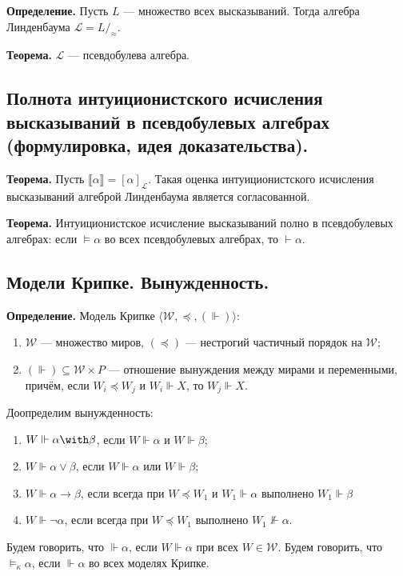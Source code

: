 \documentclass[10pt,a4paper,oneside]{article}
\begin{document}
\noindent \textbf{ Определение. }
Пусть $L$ --- множество всех высказываний. Тогда алгебра Линденбаума $\mathcal{L} = L/_\approx$.

\noindent \textbf{ Теорема. }
$\mathcal{L}$ --- псевдобулева алгебра.

\subsection{Полнота интуиционистского исчисления высказываний в псевдобулевых алгебрах (формулировка, идея доказательства).}
\noindent \textbf{ Теорема. }
Пусть $\llbracket\alpha\rrbracket = [\alpha]_\mathcal{L}$.
Такая оценка интуиционистского исчисления высказываний алгеброй Линденбаума является согласованной.

\noindent \textbf{ Теорема. }
Интуиционистское исчисление высказываний полно в псевдобулевых алгебрах:
если $\models\alpha$ во всех псевдобулевых алгебрах, то $\vdash\alpha$. 

\subsection{Модели Крипке. Вынужденность.}
\noindent \textbf{ Определение. }
Модель Крипке $\langle \mathcal{W}, \preceq, (\Vdash)\rangle$:
\begin{enumerate}
\item $\mathcal{W}$ --- множество миров, $(\preceq)$ --- нестрогий частичный порядок на $\mathcal{W}$;
\item $(\Vdash)\subseteq \mathcal{W}\times P$ --- отношение вынуждения
между мирами и переменными, причём, если $W_i \preceq W_j$ и $W_i \Vdash X$, то $W_j \Vdash X$.
\end{enumerate}


\noindent Доопределим вынужденность:
\begin{enumerate}
\item $W \Vdash \alpha\with\beta$, если $W \Vdash \alpha$ и $W \Vdash \beta$;
\item $W \Vdash \alpha\vee\beta$, если $W \Vdash \alpha$ или $W \Vdash \beta$;
\item $W \Vdash \alpha\rightarrow\beta$, если всегда при $W \preceq W_1$ и $W_1 \Vdash \alpha$ выполнено $W_1 \Vdash \beta$
\item $W \Vdash \neg\alpha$, если всегда при $W \preceq W_1$ выполнено $W_1 \not\Vdash \alpha$.
\end{enumerate}

Будем говорить, что $\Vdash\alpha$, если $W\Vdash\alpha$ при всех $W \in \mathcal{W}$.
Будем говорить, что $\models_\kappa\alpha$, если $\Vdash\alpha$ во всех моделях Крипке.
\end{document}
